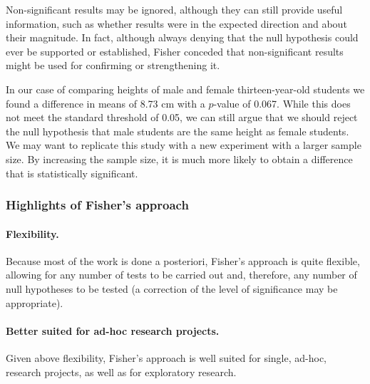 \documentclass[
]{book}
\theoremstyle{definition}
\theoremstyle{definition}
\theoremstyle{definition}
\theoremstyle{definition}
\theoremstyle{remark}
\begin{document}
Non-significant results may be ignored, although they can still provide useful information, such as whether results were in the expected direction and about their magnitude. In fact, although always denying that the null hypothesis could ever be supported or established, Fisher conceded that non-significant results might be used for confirming or strengthening it.

In our case of comparing heights of male and female thirteen-year-old students we found a difference in means of 8.73 cm with a \(p\)-value of 0.067. While this does not meet the standard threshold of 0.05, we can still argue that we should reject the null hypothesis that male students are the same height as female students. We may want to replicate this study with a new experiment with a larger sample size. By increasing the sample size, it is much more likely to obtain a difference that is statistically significant.

\hypertarget{highlights-of-fishers-approach}{%
\subsubsection*{Highlights of Fisher's approach}\label{highlights-of-fishers-approach}}

\hypertarget{flexibility.}{%
\paragraph*{Flexibility.}\label{flexibility.}}

Because most of the work is done a posteriori, Fisher's approach is quite flexible, allowing for any number of tests to be carried out and, therefore, any number of null hypotheses to be tested (a correction of the level of significance may be appropriate).

\hypertarget{better-suited-for-ad-hoc-research-projects.}{%
\paragraph*{Better suited for ad-hoc research projects.}\label{better-suited-for-ad-hoc-research-projects.}}

Given above flexibility, Fisher's approach is well suited for single, ad-hoc, research projects, as well as for exploratory research.
\end{document}
